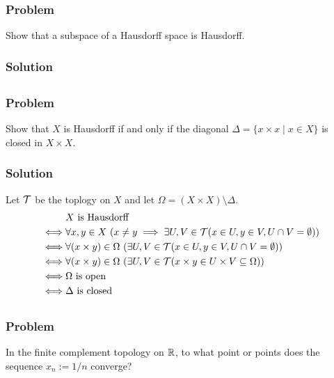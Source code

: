 \subsubsection{Problem}
Show that a subspace of a Hausdorff space is Hausdorff.
\subsubsection{Solution}
\todo


\subsection{}
\subsubsection{Problem}
Show that $X$ is Hausdorff if and only if the diagonal $\Delta = \{x \times x \mid x \in X\}$ is closed in $X \times X$.
\subsubsection{Solution}
Let $\mathcal T$ be the toplogy on $X$ and let $\Omega = (X \times X) \setminus \Delta$.
\begin{align*}
& X \textrm{ is Hausdorff} \\
\iff& \forall x,y \in X \ (x \neq y \implies \exists U, V \in \mathcal T (x \in U, y \in V, U \cap V = \emptyset)) \\
\iff& \forall (x \times y) \in \Omega \ ( \exists U, V \in \mathcal T (x \in U, y \in V, U \cap V = \emptyset)) \\
\iff& \forall (x \times y) \in \Omega \ ( \exists U, V \in \mathcal T ( x \times y \in U \times V \subseteq \Omega)) \\
\iff& \Omega \textrm{ is open} \\
\iff& \Delta \textrm{ is closed}
\end{align*}


\subsection{}

\subsubsection{Problem}
In the finite complement topology on $\mathbb R$, to what point or points does the sequence $x_n := 1/n$ converge?
